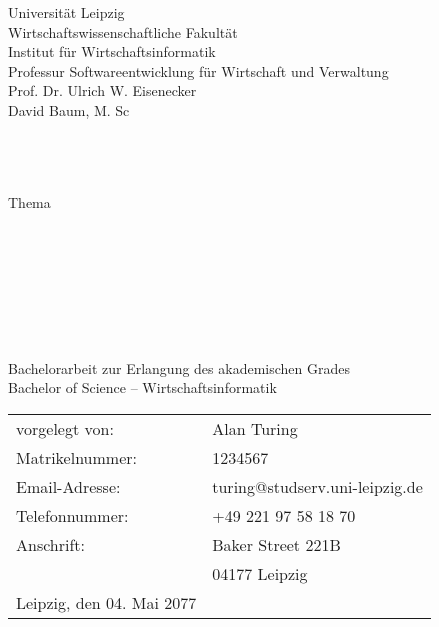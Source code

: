 \begin{titlepage}{
	\sffamily 
	\begin{flushleft}
	\begin{doublespace}
		Universität Leipzig 						\\
		Wirtschaftswissenschaftliche Fakultät				\\
		Institut für Wirtschaftsinformatik				\\
		Professur Softwareentwicklung für Wirtschaft und Verwaltung	\\
		Prof. Dr. Ulrich W. Eisenecker					\\
		David Baum, M. Sc						\\\ \\\ \\\ \\
	\end{doublespace}
	\end{flushleft}
	\begin{center}
		\begin{large}Thema\end{large}\\\ \\
		\begin{Large}
			\makeatletter
			\textbf{\@title}
			\makeatother
		\end{Large}\\\ \\\ \\\ \\
		
		Bachelorarbeit zur Erlangung des akademischen Grades \\
		Bachelor of Science – Wirtschaftsinformatik

		\vfill
	\end{center}
	\begin{onehalfspace}
	\begin{tabular}{ll}
			vorgelegt von: 	& Alan Turing 		\\
			Matrikelnummer:	& 1234567 		\\
			Email-Adresse: 	& turing@studserv.uni-leipzig.de	\\
			Telefonnummer: 	& +49 221 97 58 18 70	\\
			Anschrift:     	& Baker Street 221B\\
					& 04177 Leipzig	\\
			Leipzig, den 04. Mai 2077
	\end{tabular}\\\ \\\ \
	\end{onehalfspace}
}\end{titlepage} 
